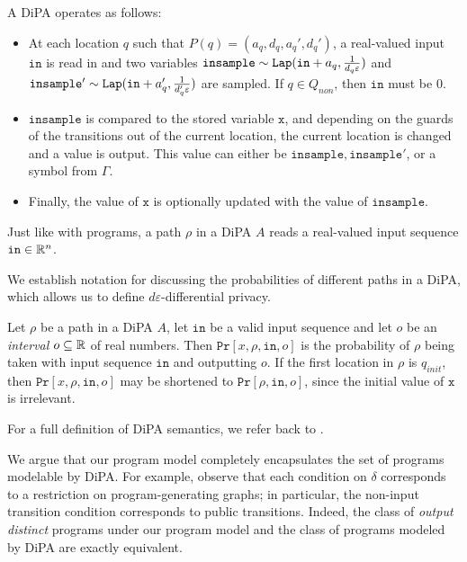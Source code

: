 A DiPA operates as follows: 
\begin{itemize}
    \item At each location $q$ such that $P(q) = (a_q, d_q, a_q', d_q')$, a real-valued input $\texttt{in}$ is read in and two variables $\texttt{insample}\sim \texttt{Lap}(\texttt{in}+a_q, \frac{1}{d_q\varepsilon})$ and $\texttt{insample}'\sim\texttt{Lap}(\texttt{in}+a_q', \frac{1}{d_q'\varepsilon})$ are sampled. If $q\in Q_{non}$, then $\texttt{in}$ must be 0.
    \item $\texttt{insample}$ is compared to the stored variable $\texttt{x}$, and depending on the guards of the transitions out of the current location, the current location is changed and a value is output. This value can either be $\texttt{insample}, \texttt{insample}'$, or a symbol from $\Gamma$.
    \item Finally, the  value of $\texttt{x}$ is optionally updated with the value of $\texttt{insample}$.
\end{itemize}

Just like with programs, a path $\rho$ in a DiPA $A$ reads a real-valued input sequence $\texttt{in}\in \mathbb{R}^n$.

We establish notation for discussing the probabilities of different paths in a DiPA, which allows us to define $d\varepsilon$-differential privacy. 

\begin{defn} 
    Let $\rho$ be a path in a DiPA $A$, let $\texttt{in}$ be a valid input sequence and let $o$ be an \textit{interval} $o\subseteq \mathbb{R}$ of real numbers.
    Then $\texttt{Pr}[x, \rho, \texttt{in}, o]$ is the probability of $\rho$ being taken with input sequence $\texttt{in}$ and outputting $o$. If the first location in $\rho$ is $q_{init}$, then $\texttt{Pr}[x, \rho, \texttt{in}, o]$ may be shortened to $\texttt{Pr}[\rho, \texttt{in}, o]$, since the initial value of $\texttt{x}$ is irrelevant.
\end{defn}

For a full definition of DiPA semantics, we refer back to \cite{chadhaLinearTimeDecidability2021}. 

We argue that our program model completely encapsulates the set of programs modelable by DiPA. 
For example, observe that each condition on $\delta$ corresponds to a restriction on program-generating graphs; in particular, the non-input transition condition corresponds to public transitions. 
Indeed, the class of \textit{output distinct} programs under our program model and the class of programs modeled by DiPA are exactly equivalent. 

